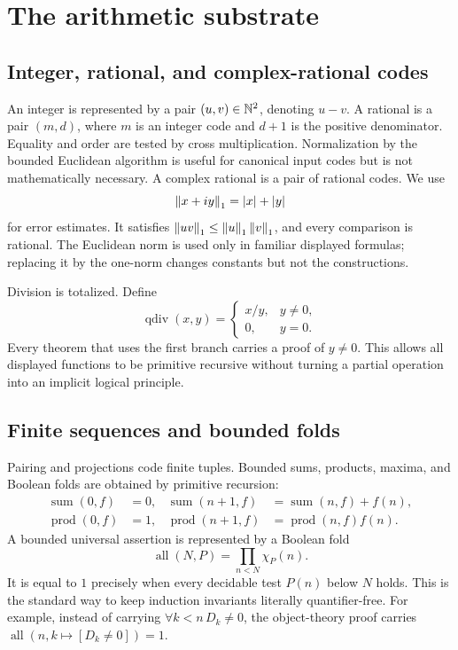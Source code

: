 \section{The arithmetic substrate}\label{sec:arithmetic}

\subsection{Integer, rational, and complex-rational codes}

An integer is represented by a pair \((u,v)\in\mathbb N^2\), denoting \(u-v\).
A rational is a pair \((m,d)\), where \(m\) is an integer code and \(d+1\)
is the positive denominator.  Equality and order are tested by cross
multiplication.  Normalization by the bounded Euclidean algorithm is useful
for canonical input codes but is not mathematically necessary.  A complex
rational is a pair of rational codes.  We use
\[
  \left\lVert x+iy\right\rVert_1=|x|+|y|
\]
for error estimates.  It satisfies
\(\left\lVert uv\right\rVert_1\le\left\lVert u\right\rVert_1\left\lVert v\right\rVert_1\), and every comparison is rational.
The Euclidean norm is used only in familiar displayed formulas; replacing it
by the one-norm changes constants but not the constructions.

Division is totalized.  Define
\[
 \operatorname{qdiv}(x,y)=
 \begin{cases}x/y,&y\ne0,\\0,&y=0.
 \end{cases}
\]
Every theorem that uses the first branch carries a proof of \(y\ne0\).  This
allows all displayed functions to be primitive recursive without turning a
partial operation into an implicit logical principle.

\subsection{Finite sequences and bounded folds}

Pairing and projections code finite tuples.  Bounded sums, products, maxima,
and Boolean folds are obtained by primitive recursion:
\begin{align*}
 \operatorname{sum}(0,f)&=0,&
 \operatorname{sum}(n+1,f)&=\operatorname{sum}(n,f)+f(n),\\
 \operatorname{prod}(0,f)&=1,&
 \operatorname{prod}(n+1,f)&=\operatorname{prod}(n,f)f(n).
\end{align*}
A bounded universal assertion is represented by a Boolean fold
\[
  \operatorname{all}(N,P)=\prod_{n<N}\chi_P(n).
\]
It is equal to \(1\) precisely when every decidable test \(P(n)\) below \(N\)
holds.  This is the standard way to keep induction invariants literally
quantifier-free.  For example, instead of carrying
\(\forall k<n\,D_k\ne0\), the object-theory proof carries
\(\operatorname{all}(n,k\mapsto[D_k\ne0])=1\).

